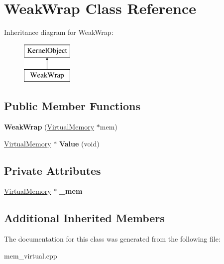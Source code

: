 \hypertarget{class_weak_wrap}{}\section{Weak\+Wrap Class Reference}
\label{class_weak_wrap}
Inheritance diagram for Weak\+Wrap\+:\begin{figure}[H]
\begin{center}
\leavevmode
\includegraphics[height=2.000000cm]{class_weak_wrap}
\end{center}
\end{figure}
\subsection*{Public Member Functions}
\begin{DoxyCompactItemize}
\item 
\mbox{\label{class_weak_wrap_a62c94d1f883b02c76d2b11543447c028}} 
{\bfseries Weak\+Wrap} (\hyperlink{class_virtual_memory}{Virtual\+Memory} $\ast$mem)
\item 
\mbox{\label{class_weak_wrap_a0d81a771dd5f1a03a31d3496c27bd8a9}} 
\hyperlink{class_virtual_memory}{Virtual\+Memory} $\ast$ {\bfseries Value} (void)
\end{DoxyCompactItemize}
\subsection*{Private Attributes}
\begin{DoxyCompactItemize}
\item 
\mbox{\label{class_weak_wrap_a28de97519014ed0caeeaeed60f6187ce}} 
\hyperlink{class_virtual_memory}{Virtual\+Memory} $\ast$ {\bfseries \+\_\+mem}
\end{DoxyCompactItemize}
\subsection*{Additional Inherited Members}


The documentation for this class was generated from the following file\+:\begin{DoxyCompactItemize}
\item 
mem\+\_\+virtual.\+cpp\end{DoxyCompactItemize}
